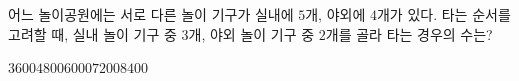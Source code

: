 \hspace*{2mm}\begin{minipage}[t]{\dimexpr\linewidth-2mm\relax}\vspace{0pt}
어느 놀이공원에는 서로 다른 놀이 기구가 실내에 $5$개, 야외에 $4$개가 있다. 타는 순서를 고려할 때, 실내 놀이 기구 중 $3$개, 야외 놀이 기구 중 $2$개를 골라 타는 경우의 수는?
\begin{choices32}{$3600$}{$4800$}{$6000$}{$7200$}{$8400$}\end{choices32}\end{minipage}
